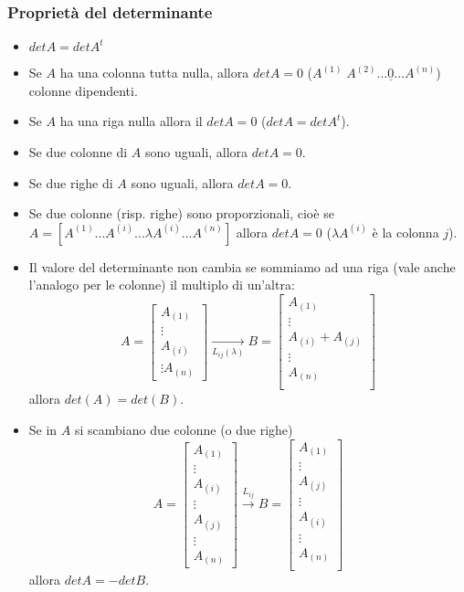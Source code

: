 \subsubsection{Proprietà del determinante}
\begin{itemize}
  \item $detA=detA^t$
  \item Se $A$ ha una colonna tutta nulla, allora $detA=0$ ($A^{(1)}\;A^{(2)}...\underline{0}...A^{(n)}$) colonne dipendenti.
  \item Se $A$ ha una riga nulla allora il $detA=0$ ($detA=detA^t$).
  \item Se due colonne di $A$ sono uguali, allora $detA=0$.
  \item Se due righe di $A$ sono uguali, allora $detA=0$.
  \item Se due colonne (risp. righe) sono proporzionali, cioè se $A=[A^{(1)}...A^{(i)}...\lambda A^{(i)}...A^{(n)}]$ allora $detA=0$ ($\lambda A^{(i)}$ è la colonna $j$).
  \item Il valore del determinante non cambia se sommiamo ad una riga (vale anche l'analogo per le colonne) il multiplo di un'altra:
    \[A=
    \begin{bmatrix}
      A_{(1)}\\
      \vdots\\
      A_{(i)}\\
      \vdots
      A_{(n)}
    \end{bmatrix}
    \xrightarrow[L_{ij}(\lambda)]{}
    B=
    \begin{bmatrix}
      A_{(1)}\\
      \vdots\\
      A_{(i)}+A_{(j)}\\
      \vdots\\
      A_{(n)}\\
    \end{bmatrix}
    \]
    allora $det(A)=det(B)$.
  \item Se in $A$ si scambiano due colonne (o due righe)
\[
    A=
    \begin{bmatrix}
      A_{(1)}\\
      \vdots\\
      A_{(i)}\\
      \vdots\\
      A_{(j)}\\
      \vdots\\
      A_{(n)}
    \end{bmatrix}
    \xrightarrow[]{L_{ij}}
    B=
    \begin{bmatrix}
      A_{(1)}\\
      \vdots\\
      A_{(j)}\\
      \vdots\\
      A_{(i)}\\
      \vdots\\
      A_{(n)}\\
    \end{bmatrix}
\]
allora $detA=-detB$.
  \end{itemize}

